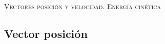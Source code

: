 \documentclass[11pt, spanish, a4paper, twoside]{article}
\begin{document}
\begin{center}
	\textsc{\large Vectores posición y velocidad. Energía cinética}
\end{center}


			

\begin{enumerate}
	\section*{Vector posición}
	

\end{enumerate}
\end{document}
